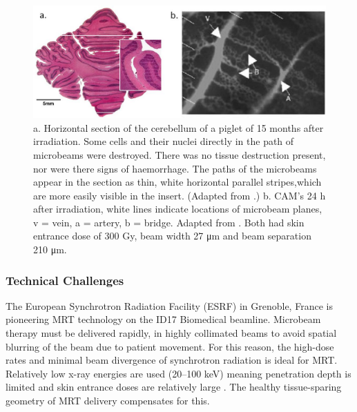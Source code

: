 	\begin{figure}
	\centering
	\includegraphics[width=\linewidth]{mrt_img/blattmann_mrt_hist}
	\caption{a. Horizontal section of the cerebellum of a piglet of 15 months after irradiation. Some cells and their nuclei directly in the path of microbeams were destroyed. There was no tissue destruction present, nor were there signs of haemorrhage. The paths of the microbeams appear in the section as thin, white horizontal parallel stripes,which are more easily visible in the insert. (Adapted from \cite{laissue2001weanling}.) b. CAM’s 24 h after irradiation, white lines indicate locations of microbeam planes, v = vein,  a = artery, b = bridge. Adapted from \cite{blattmann2005applications}. Both had skin entrance dose of 300 Gy, beam width 27 \si{\um} and beam separation 210 \si{\um}.}
	\label{fig:blattmann_mrt_hist}
	\end{figure}
	

	
	\subsubsection{Technical Challenges}
	
	
	The European Synchrotron Radiation Facility (ESRF) in Grenoble, France is pioneering MRT technology on the ID17 Biomedical beamline. Microbeam therapy must be delivered rapidly, in highly collimated beams to avoid spatial blurring of the beam due to patient movement. For this reason, the high-dose rates and minimal beam divergence of synchrotron radiation is ideal for MRT. Relatively low x-ray energies are used (20--100 keV) meaning penetration depth is limited and skin entrance doses are relatively large \cite{blattmann2005applications}. The healthy tissue-sparing geometry of MRT delivery compensates for this.
	
